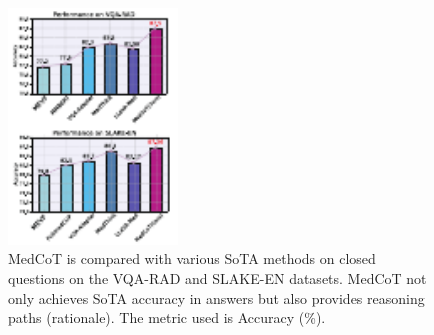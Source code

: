 \documentclass[11pt]{article}
\begin{document}
\begin{figure}[t]
\centering
\includegraphics[width=0.4\textwidth]{image/Performance5.pdf}
\caption{
MedCoT is compared with various SoTA methods on closed questions on the VQA-RAD and SLAKE-EN datasets. MedCoT not only achieves SoTA accuracy in answers but also provides reasoning paths (rationale). The metric used is Accuracy (\%).
} 
\label{performance}
\vspace{-1em}
\end{figure}
\end{document}
